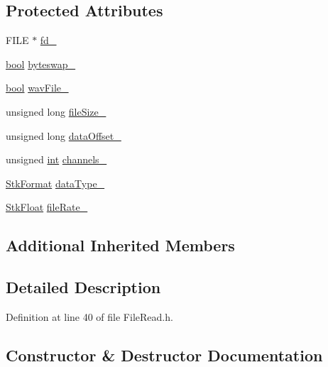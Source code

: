 \subsection*{Protected Attributes}
\begin{DoxyCompactItemize}
\item 
F\+I\+LE $\ast$ \hyperlink{class_nyq_1_1_file_read_a01c3c37b41360e2ab217f4a2d7832c95}{fd\+\_\+}
\item 
\hyperlink{mac_2config_2i386_2lib-src_2libsoxr_2soxr-config_8h_abb452686968e48b67397da5f97445f5b}{bool} \hyperlink{class_nyq_1_1_file_read_a036ded8650f3616cb5c278a290261bb6}{byteswap\+\_\+}
\item 
\hyperlink{mac_2config_2i386_2lib-src_2libsoxr_2soxr-config_8h_abb452686968e48b67397da5f97445f5b}{bool} \hyperlink{class_nyq_1_1_file_read_aaff2e8be9c74d5f03353e30268bee42d}{wav\+File\+\_\+}
\item 
unsigned long \hyperlink{class_nyq_1_1_file_read_a0da2f6260e43658b06f9da9bd29d692d}{file\+Size\+\_\+}
\item 
unsigned long \hyperlink{class_nyq_1_1_file_read_ad6ba31c1d2ee7dd2ec0def9f92571f43}{data\+Offset\+\_\+}
\item 
unsigned \hyperlink{xmltok_8h_a5a0d4a5641ce434f1d23533f2b2e6653}{int} \hyperlink{class_nyq_1_1_file_read_a8726d7b043c7ef91414e635d1a87a984}{channels\+\_\+}
\item 
\hyperlink{class_nyq_1_1_stk_aa6d484c1fa51ab651997a158cdc42526}{Stk\+Format} \hyperlink{class_nyq_1_1_file_read_a517ebf8d7ef853021a1cc39cefbc95bb}{data\+Type\+\_\+}
\item 
\hyperlink{namespace_nyq_a044fa20a706520a617bbbf458a7db7e4}{Stk\+Float} \hyperlink{class_nyq_1_1_file_read_a4593b27e0da17e51e7dd52c6cb48428a}{file\+Rate\+\_\+}
\end{DoxyCompactItemize}
\subsection*{Additional Inherited Members}


\subsection{Detailed Description}


Definition at line 40 of file File\+Read.\+h.



\subsection{Constructor \& Destructor Documentation}
